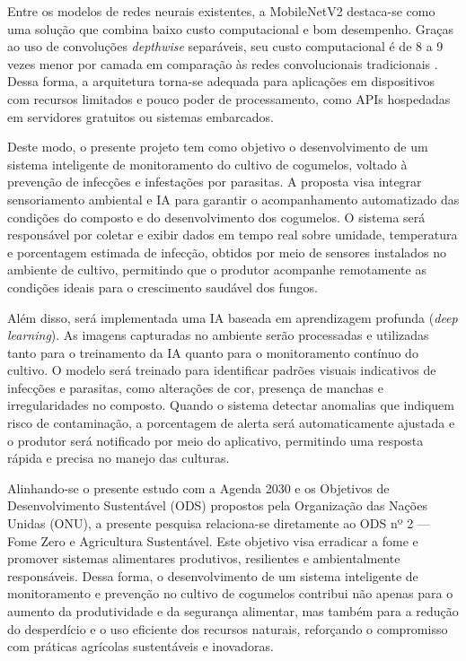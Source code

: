 \documentclass[11pt,a4paper]{article}
\begin{document}
Entre os modelos de redes neurais existentes, a MobileNetV2 destaca-se como uma solução que combina baixo custo computacional e bom desempenho. Graças ao uso de convoluções \textit{depthwise} separáveis, seu custo computacional é de 8 a 9 vezes menor por camada em comparação às redes convolucionais tradicionais \cite{Sandler2018}. Dessa forma, a arquitetura torna-se adequada para aplicações em dispositivos com recursos limitados e pouco poder de processamento, como APIs hospedadas em servidores gratuitos ou sistemas embarcados.

Deste modo, o presente projeto tem como objetivo o desenvolvimento de um sistema inteligente de monitoramento do cultivo de cogumelos, voltado à prevenção de infecções e infestações por parasitas. A proposta visa integrar sensoriamento ambiental e IA para garantir o acompanhamento automatizado das condições do composto e do desenvolvimento dos cogumelos. O sistema será responsável por coletar e exibir dados em tempo real sobre umidade, temperatura e porcentagem estimada de infecção, obtidos por meio de sensores instalados no ambiente de cultivo, permitindo que o produtor acompanhe remotamente as condições ideais para o crescimento saudável dos fungos.

Além disso, será implementada uma IA baseada em aprendizagem profunda (\textit{deep learning}). As imagens capturadas no ambiente serão processadas e utilizadas tanto para o treinamento da IA quanto para o monitoramento contínuo do cultivo. O modelo será treinado para identificar padrões visuais indicativos de infecções e parasitas, como alterações de cor, presença de manchas e irregularidades no composto. Quando o sistema detectar anomalias que indiquem risco de contaminação, a porcentagem de alerta será automaticamente ajustada e o produtor será notificado por meio do aplicativo, permitindo uma resposta rápida e precisa no manejo das culturas.

Alinhando-se o presente estudo com a Agenda 2030 e os Objetivos de Desenvolvimento Sustentável (ODS) propostos pela Organização das Nações Unidas (ONU), a presente pesquisa relaciona-se diretamente ao ODS nº 2 --- Fome Zero e Agricultura Sustentável. Este objetivo visa erradicar a fome e promover sistemas alimentares produtivos, resilientes e ambientalmente responsáveis. Dessa forma, o desenvolvimento de um sistema inteligente de monitoramento e prevenção no cultivo de cogumelos contribui não apenas para o aumento da produtividade e da segurança alimentar, mas também para a redução do desperdício e o uso eficiente dos recursos naturais, reforçando o compromisso com práticas agrícolas sustentáveis e inovadoras.
\end{document}
